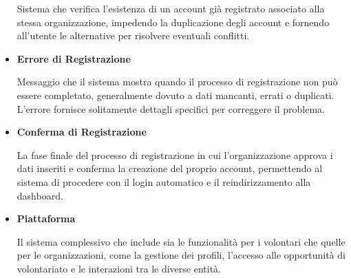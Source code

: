 \begin{itemize}
Sistema che verifica l'esistenza di un account già registrato associato alla stessa organizzazione, impedendo la duplicazione degli account e fornendo all'utente le alternative per risolvere eventuali conflitti.

\item \textbf{Errore di Registrazione}

Messaggio che il sistema mostra quando il processo di registrazione non può essere completato, generalmente dovuto a dati mancanti, errati o duplicati. L'errore fornisce solitamente dettagli specifici per correggere il problema.

\item \textbf{Conferma di Registrazione}

La fase finale del processo di registrazione in cui l'organizzazione approva i dati inseriti e conferma la creazione del proprio account, permettendo al sistema di procedere con il login automatico e il reindirizzamento alla dashboard.

\item \textbf{Piattaforma}

Il sistema complessivo che include sia le funzionalità per i volontari che quelle per le organizzazioni, come la gestione dei profili, l'accesso alle opportunità di volontariato e le interazioni tra le diverse entità.

\end{itemize}